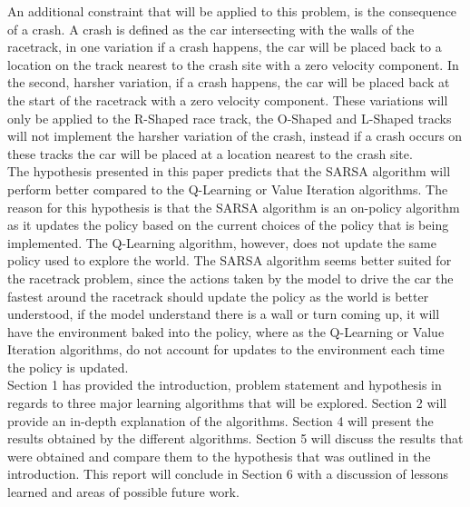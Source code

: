 \documentclass[twoside,11pt]{article}
\begin{document}
\hspace*{10mm} An additional constraint that will be applied to this problem, is the consequence of a crash. A crash is defined as the car intersecting with the walls of the racetrack, in one variation if a crash happens, the car will be placed back to a location on the track nearest to the crash site with a zero velocity component. In the second, harsher variation, if a crash happens, the car will be placed back at the start of the racetrack with a zero velocity component. These variations will only be applied to the R-Shaped race track, the O-Shaped and L-Shaped tracks will not implement the harsher variation of the crash, instead if a crash occurs on these tracks the car will be placed at a location nearest to the crash site. \\

\hspace*{10mm} The hypothesis presented in this paper predicts that the SARSA algorithm will perform better compared to the Q-Learning or Value Iteration algorithms. The reason for this hypothesis is that the SARSA algorithm is an on-policy algorithm as it updates the policy based on the current choices of the policy that is being implemented. The Q-Learning algorithm, however, does not update the same policy used to explore the world. The SARSA algorithm seems better suited for the racetrack problem, since the actions taken by the model to drive the car the fastest around the racetrack should update the policy as the world is better understood, if the model understand there is a wall or turn coming up, it will have the environment baked into the policy, where as the Q-Learning or Value Iteration algorithms, do not account for updates to the environment each time the policy is updated.\\ 

\hspace*{10mm} Section 1 has provided the introduction, problem statement and hypothesis in regards to three major learning algorithms that will be explored. Section 2 will provide an in-depth explanation of the algorithms. Section 4 will present the results obtained by the different algorithms. Section 5 will discuss the results that were obtained and compare them to the hypothesis that was outlined in the introduction. This report will conclude in Section 6 with a discussion of lessons learned and areas of possible future work.\\

\newpage
\end{document}
